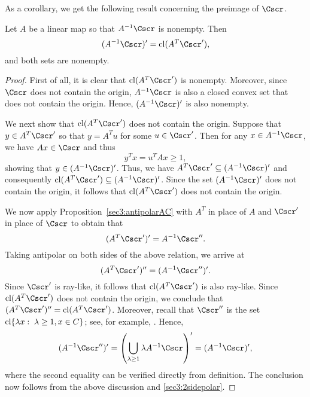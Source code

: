 \documentclass{siamltex}   %
\begin{document}
  As a corollary, we get the following result concerning the preimage of $\Cscr$.
  \begin{corollary}\label{sec3:cor1}
    Let $A$ be a linear map so that $A^{-1}\Cscr$ is nonempty. Then
    \[
    (A^{-1}\Cscr)' = {\rm cl}(A^T\Cscr'),
    \]
    and both sets are nonempty.
  \end{corollary}
  \begin{proof}
    First of all, it is clear that ${\rm cl}(A^T\Cscr')$ is nonempty. Moreover, since $\Cscr$ does not contain the origin, $A^{-1}\Cscr$
    is also a closed convex set that does not contain the origin. Hence, $(A^{-1}\Cscr)'$ is also nonempty.

    We next show that ${\rm cl}(A^T\Cscr')$ does not contain the origin. Suppose that $y\in A^T\Cscr'$ so that
    $y = A^Tu$ for some $u\in \Cscr'$. Then for any $x\in A^{-1}\Cscr$, we have
    $Ax\in \Cscr$ and thus
    \[
    y^Tx = u^TAx \ge 1,
    \]
    showing that $y\in (A^{-1}\Cscr)'$. Thus, we have $A^T\Cscr'\subseteq (A^{-1}\Cscr)'$ and consequently ${\rm cl}(A^T\Cscr')\subseteq (A^{-1}\Cscr)'$.
    Since the set $(A^{-1}\Cscr)'$ does not contain the origin, it follows that ${\rm cl}(A^T\Cscr')$ does not contain the origin.

    We now apply Proposition~\ref{sec3:antipolarAC} with $A^T$ in place of $A$ and $\Cscr'$ in place of $\Cscr$ to obtain that
    \begin{equation*}
      (A^T\Cscr')' = A^{-1}\Cscr''.
    \end{equation*}
    Taking antipolar on both sides of the above relation, we arrive at
    \begin{equation}\label{sec3:2sidepolar}
    (A^T\Cscr')'' = (A^{-1}\Cscr'')'.
    \end{equation}
    Since $\Cscr'$ is ray-like,
    it follows that ${\rm cl}(A^T\Cscr')$ is also ray-like. Since ${\rm cl}(A^T\Cscr')$ does not contain the origin, we conclude that
    $(A^T\Cscr')'' = {\rm cl}(A^T\Cscr')$. Moreover, recall that $\Cscr''$ is the set ${\rm cl}\{\lambda x:\; \lambda\ge 1, x\in C\}$;
    see, for example, \cite[Page~176]{McLinden:1978}. Hence,
    \[
    (A^{-1}\Cscr'')' = \left(\bigcup_{\lambda\ge 1}\lambda A^{-1}\Cscr\right)' = (A^{-1}\Cscr)',
    \]
    where the second equality can be verified directly from definition. The conclusion now follows from the above discussion and \eqref{sec3:2sidepolar}.
  \end{proof}
\end{document}
